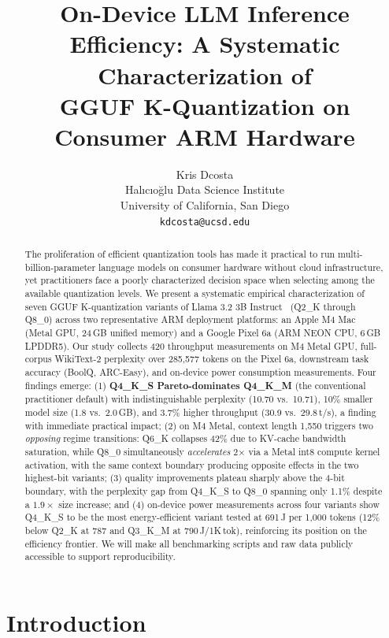 \documentclass{article}
\title{On-Device LLM Inference Efficiency: A Systematic Characterization of\\
GGUF K-Quantization on Consumer ARM Hardware}
\author{%
  Kris Dcosta \\
  Halıcıoğlu Data Science Institute \\
  University of California, San Diego \\
  \texttt{kdcosta@ucsd.edu} \\
}
\begin{document}
\maketitle

\begin{abstract}
The proliferation of efficient quantization tools has made it practical to run multi-billion-parameter language models on consumer hardware without cloud infrastructure, yet practitioners face a poorly characterized decision space when selecting among the available quantization levels. We present a systematic empirical characterization of seven GGUF K-quantization variants of Llama 3.2 3B Instruct~\cite{llama3} (Q2\_K through Q8\_0) across two representative ARM deployment platforms: an Apple M4 Mac (Metal GPU, 24\,GB unified memory) and a Google Pixel 6a (ARM NEON CPU, 6\,GB LPDDR5). Our study collects 420 throughput measurements on M4 Metal GPU, full-corpus WikiText-2 perplexity over 285,577 tokens on the Pixel 6a, downstream task accuracy (BoolQ, ARC-Easy), and on-device power consumption measurements. Four findings emerge: (1) \textbf{Q4\_K\_S Pareto-dominates Q4\_K\_M} (the conventional practitioner default) with indistinguishable perplexity (10.70 vs.\ 10.71), 10\% smaller model size (1.8 vs.\ 2.0\,GB), and 3.7\% higher throughput (30.9 vs.\ 29.8\,t/s), a finding with immediate practical impact; (2) on M4 Metal, context length 1,550 triggers two \emph{opposing} regime transitions: Q6\_K collapses 42\% due to KV-cache bandwidth saturation, while Q8\_0 simultaneously \emph{accelerates} 2$\times$ via a Metal int8 compute kernel activation, with the same context boundary producing opposite effects in the two highest-bit variants; (3) quality improvements plateau sharply above the 4-bit boundary, with the perplexity gap from Q4\_K\_S to Q8\_0 spanning only 1.1\% despite a $1.9\times$ size increase; and (4) on-device power measurements across four variants show Q4\_K\_S to be the most energy-efficient variant tested at 691\,J per 1,000 tokens (12\% below Q2\_K at 787 and Q3\_K\_M at 790\,J/1K\,tok), reinforcing its position on the efficiency frontier. We will make all benchmarking scripts and raw data publicly accessible to support reproducibility.
\end{abstract}

\section{Introduction}
\label{sec:intro}
\end{document}
